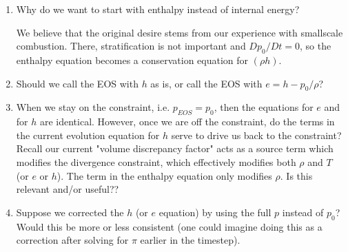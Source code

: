 \begin{enumerate}
\item Why do we want to start with enthalpy instead of internal energy?

   We believe that the original desire stems from our experience with smallscale 
   combustion.  There, stratification is not important and $Dp_0/Dt = 0$, so
   the enthalpy equation becomes a conservation equation for $(\rho h)$.

\item Should we call the EOS with $h$ as is, or call the EOS with $e = h - p_0 / \rho$?

\item When we stay on the constraint, i.e. $p_{EOS} = p_0$, then the equations for $e$ and
for $h$ are identical.   However, once we are off the constraint, do the terms in the
current evolution equation for $h$ serve to drive us back to the constraint?  Recall
our current "volume discrepancy factor" acts as a source term which modifies the
divergence constraint, which effectively modifies both $\rho$ and $T$ (or $e$ or $h$).
The term in the enthalpy equation only modifies $\rho.$  Is this relevant and/or useful??


\item Suppose we corrected the $h$ (or $e$ equation) by using the full $p$ instead
of $p_0$?  Would this be more or less consistent (one could imagine doing this as a 
correction after solving for $\pi$ earlier in the timestep). 

%
%
%

\end{enumerate}






